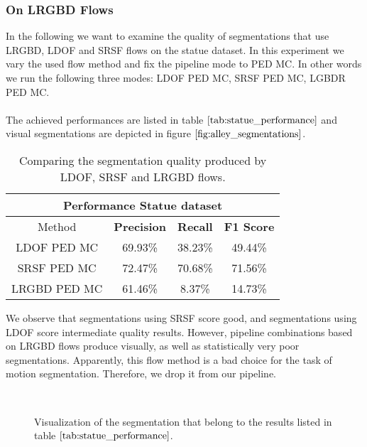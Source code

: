 \subsubsection{On LRGBD Flows}
In the following we want to examine the quality of segmentations that use LRGBD, LDOF and SRSF flows on the statue dataset. In this experiment we vary the used flow method and fix the pipeline mode to PED MC. In other words we run the following three modes: LDOF PED MC, SRSF PED MC, LGBDR PED MC. \\ \\
The achieved performances are listed in table $\ref{tab:statue_performance}$ and visual segmentations are depicted in figure $\ref{fig:alley_segmentations}$.
\begin{table}[H]
\centering
\begin{tabular}{|c|c|c|c|}
\hline
\multicolumn{4}{|c|}{Performance Statue dataset}                        \\ \hline
Method & \textbf{Precision} & \textbf{Recall} & \textbf{F1 Score} \\ \hline
LDOF PED MC & 69.93\%   & 38.23\%     & 49.44\%  \\ \hline
SRSF PED MC & 72.47\%   & 70.68\%     & 71.56\%  \\ \hline
LRGBD PED MC & 61.46\%   & 8.37\%     & 14.73\%  \\ \hline              
\end{tabular}
\caption[Performance Statue]{Comparing the segmentation quality produced by LDOF, SRSF and LRGBD flows.}
\label{tab:statue_performance}
\end{table}
We observe that segmentations using SRSF score good, and segmentations using LDOF score intermediate quality results. However, pipeline combinations based on LRGBD flows produce visually, as well as statistically very poor segmentations. Apparently, this flow method is a bad choice for the task of motion segmentation. Therefore, we drop it from our pipeline. 
\begin{figure}[H]
\begin{center}
~
\end{center}
\caption[Bonn Cerealbox Segmentations]{Visualization of the segmentation that belong to the results listed in table $\ref{tab:statue_performance}$.}
\label{fig:alley_segmentations}
\end{figure}
